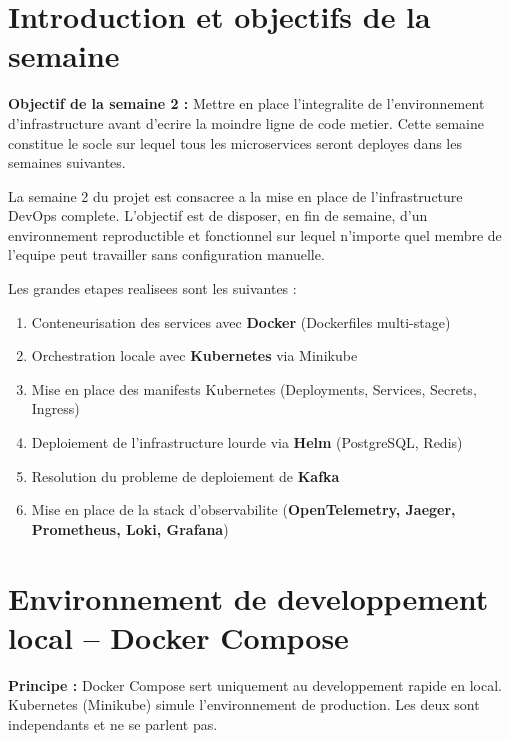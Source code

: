 \documentclass[12pt,a4paper]{article}
\begin{document}
\section{Introduction et objectifs de la semaine}

\begin{infobox}
\textbf{Objectif de la semaine 2 :} Mettre en place l'integralite de l'environnement
d'infrastructure avant d'ecrire la moindre ligne de code metier. Cette semaine constitue
le socle sur lequel tous les microservices seront deployes dans les semaines suivantes.
\end{infobox}

\vspace{0.5cm}

La semaine 2 du projet est consacree a la mise en place de l'infrastructure DevOps
complete. L'objectif est de disposer, en fin de semaine, d'un environnement reproductible
et fonctionnel sur lequel n'importe quel membre de l'equipe peut travailler sans
configuration manuelle.

Les grandes etapes realisees sont les suivantes :

\begin{enumerate}[leftmargin=*, label=\textbf{\arabic*.}]
  \item Conteneurisation des services avec \textbf{Docker} (Dockerfiles multi-stage)
  \item Orchestration locale avec \textbf{Kubernetes} via Minikube
  \item Mise en place des manifests Kubernetes (Deployments, Services, Secrets, Ingress)
  \item Deploiement de l'infrastructure lourde via \textbf{Helm} (PostgreSQL, Redis)
  \item Resolution du probleme de deploiement de \textbf{Kafka}
  \item Mise en place de la stack d'observabilite (\textbf{OpenTelemetry, Jaeger, Prometheus, Loki, Grafana})
\end{enumerate}

\section{Environnement de developpement local -- Docker Compose}

\begin{infobox}
\textbf{Principe :} Docker Compose sert uniquement au developpement rapide en local.
Kubernetes (Minikube) simule l'environnement de production. Les deux sont independants
et ne se parlent pas.
\end{infobox}
\end{document}
